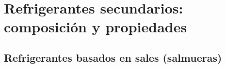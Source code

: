 




	\section{Refrigerantes secundarios: composición y propiedades}

	\subsection{Refrigerantes basados en sales (salmueras)}


